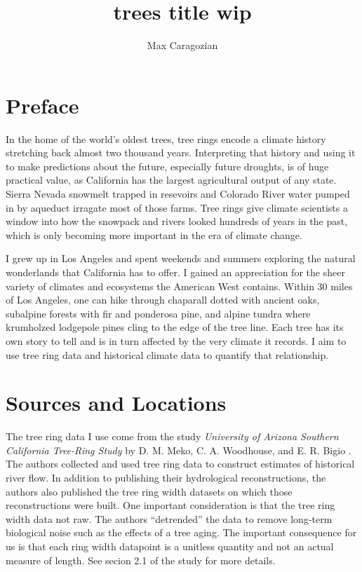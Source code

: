 \documentclass[]{article}
\title{trees title wip}
\author{Max Caragozian}
\begin{document}
	


\maketitle

\section{Preface}

In the home of the world's oldest trees, tree rings encode a climate history stretching back almost two thousand years. Interpreting that history and using it to make predictions about the future, especially future droughts, is of huge practical value, as California has the largest agricultural output of any state. Sierra Nevada snowmelt trapped in resevoirs and Colorado River water pumped in by aqueduct irragate most of those farms. Tree rings give climate scientists a window into how the snowpack and rivers looked hundreds of years in the past, which is only becoming more important in the era of climate change.

I grew up in Los Angeles and spent weekends and summers exploring the natural wonderlands that California has to offer. I gained an appreciation for the sheer variety of climates and ecosystems the American West contains. Within 30 miles of Los Angeles, one can hike through chaparall dotted with ancient oaks, subalpine forests with fir and ponderosa pine, and alpine tundra where krumholzed lodgepole pines cling to the edge of the tree line. Each tree has its own story to tell and is in turn affected by the very climate it records. I aim to use tree ring data and historical climate data to quantify that relationship.

\section{Sources and Locations}
The tree ring data I use come from the study  \textit{University of Arizona Southern California Tree-Ring Study} by D. M. Meko, C. A. Woodhouse, and E. R. Bigio \cite{tree_study}. The authors collected and used tree ring data to construct estimates of historical river flow. In addition to publishing their hydrological reconstructions, the authors also published the tree ring width datasets on which those reconstructions were built. One important consideration is that the tree ring width data not raw. The authors ``detrended'' the data to remove long-term biological noise such as the effects of a tree aging. The important consequence for us is that each ring width datapoint is a unitless quantity and not an actual measure of length. See secion 2.1 of the study\cite{tree_study} for more details.
\end{document}
